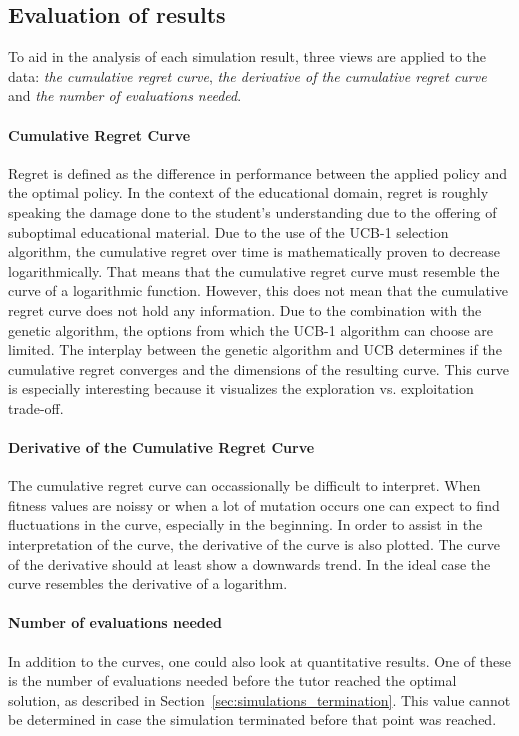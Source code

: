 \subsection{Evaluation of results}
To aid in the analysis of each simulation result, three views are applied to
the data: \emph{the cumulative regret curve}, \emph{the derivative of the
cumulative regret curve} and \emph{the number of evaluations needed}.
\paragraph{Cumulative Regret Curve} Regret is defined as the difference in
performance between the applied policy and the optimal policy. In the context
of the educational domain, regret is roughly speaking the damage done to the
student's understanding due to the offering of suboptimal educational material.
Due to the use of the UCB-1 selection algorithm, the cumulative regret over time
is mathematically proven to decrease logarithmically. That means that the
cumulative regret curve must resemble the curve of a logarithmic function.
However, this does not mean that the cumulative regret curve does not hold any
information. Due to the combination with the genetic algorithm, the options from
which the UCB-1 algorithm can choose are limited. The interplay between the
genetic algorithm and UCB determines if the cumulative regret converges and the
dimensions of the resulting curve. This curve is especially interesting because
it visualizes the exploration vs. exploitation trade-off.
\paragraph{Derivative of the Cumulative Regret Curve}
The cumulative regret curve can occassionally be difficult to interpret.
When fitness values are noissy or when a lot of mutation occurs one
can expect to find fluctuations in the curve, especially in the beginning. In
order to assist in the interpretation of the curve, the derivative of the curve
is also plotted. The curve of the derivative should at least show a downwards
trend. In the ideal case the curve resembles the derivative of a logarithm.
\paragraph{Number of evaluations needed} In addition to the curves, one could
also look at quantitative results. One of these is the number of evaluations
needed before the tutor reached the optimal solution, as described in
Section~\ref{sec:simulations_termination}. This value cannot be determined in case
the simulation terminated before that point was reached.
